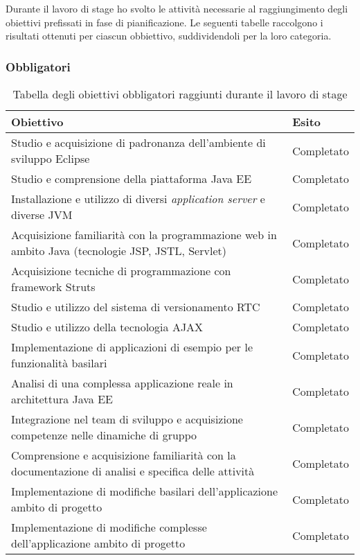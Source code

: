 Durante il lavoro di stage ho svolto le attività necessarie al raggiungimento degli obiettivi prefissati in fase di pianificazione.
Le seguenti tabelle raccolgono i risultati ottenuti per ciascun obbiettivo, suddividendoli per la loro categoria.

\subsubsection{Obbligatori}

	\begin{table}[H]
		\def\arraystretch{1.2}
		\begin{tabular}{ | p{10cm} | p{2cm} | }
		
		\rowcolor{Gray}
		\hline \textbf{Obiettivo} & \textbf{Esito} \\ \hline
		
		Studio e acquisizione di padronanza dell'ambiente di sviluppo Eclipse & Completato \\ \hline
		Studio e comprensione della piattaforma Java EE & Completato \\ \hline
		Installazione e utilizzo di diversi \textit{application server} e diverse JVM & Completato \\ \hline
		Acquisizione familiarità con la programmazione web in ambito Java (tecnologie JSP, JSTL, Servlet\glossario ) & Completato \\ \hline
		Acquisizione tecniche di programmazione con framework Struts & Completato \\ \hline
		Studio e utilizzo del sistema di versionamento RTC & Completato \\ \hline
		Studio e utilizzo della tecnologia AJAX\glossario & Completato \\ \hline
		Implementazione di applicazioni di esempio per le funzionalità basilari & Completato \\ \hline
		Analisi di una complessa applicazione reale in architettura Java EE & Completato \\ \hline
		Integrazione nel team di sviluppo e acquisizione competenze nelle dinamiche di gruppo & Completato \\ \hline
		Comprensione e acquisizione familiarità con la documentazione di analisi e specifica delle attività & Completato \\ \hline
		Implementazione di modifiche basilari dell'applicazione ambito di progetto & Completato \\ \hline
		Implementazione di modifiche complesse dell'applicazione ambito di progetto & Completato \\ \hline
		
		\end{tabular}
		\vspace{1mm}
		\caption{Tabella degli obiettivi obbligatori raggiunti durante il lavoro di stage}
	\end{table}



